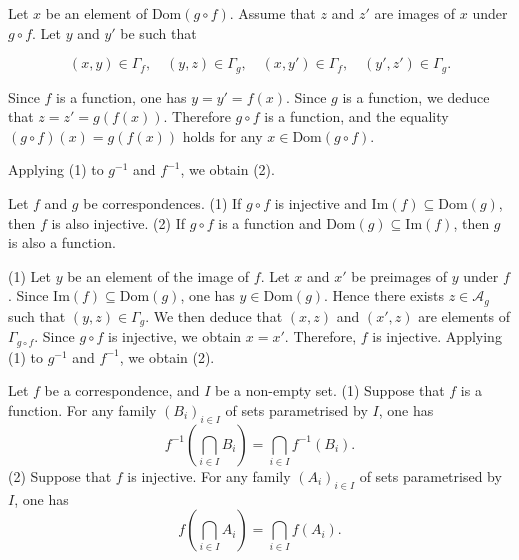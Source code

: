 \begin{proofenv}
Let \( x \) be an element of \(\text{Dom}(g \circ f)\). Assume that \( z \) and \( z' \) are images of \( x \) under \( g \circ f \). Let \( y \) and \( y' \) be such that

\[
(x,  y) \in \Gamma_f,  \quad (y,  z) \in \Gamma_g,  \quad (x,  y') \in \Gamma_f,  \quad (y',  z') \in \Gamma_g.
\]

Since \( f \) is a function,  one has \( y = y' = f(x) \). Since \( g \) is a function,  we deduce that \( z = z' = g(f(x)) \). Therefore \( g \circ f \) is a function,  and the equality \((g \circ f)(x) = g(f(x))\) holds for any \( x \in \text{Dom}(g \circ f) \).

Applying (1) to \( g^{-1} \) and \( f^{-1} \),  we obtain (2).
\end{proofenv} 


\begin{propositionenv}\label{proposition3.6.3}
    Let $f$ and $g$ be correspondences.
    \newline
    (1) If \( g \circ f \) is injective and \(\mathrm{Im}(f) \subseteq \mathrm{Dom}(g)\),  then \( f \) is also injective.
\newline
(2) If \( g \circ f \) is a function and \(\mathrm{Dom}(g) \subseteq \mathrm{Im}(f)\),  then \( g \) is also a function.
\end{propositionenv}




\begin{proofenv}
    \quad 
    \newline
    (1)  Let \( y \) be an element of the image of \( f \). Let \( x \) and \( x' \) be preimages of \( y \) under \( f \). Since \(\mathrm{Im}(f) \subseteq \mathrm{Dom}(g)\),  one has \( y \in \mathrm{Dom}(g) \). 
    Hence there exists \( z \in \mathscr{A}_g \) such that \((y,  z) \in \Gamma_g \). 
    We then deduce that \((x,  z)\) and \((x',  z)\) are elements of \(\Gamma_{g \circ f}\). Since \( g \circ f \) is injective,  we obtain \( x = x' \). Therefore,  \( f \) is injective.
\newline
Applying (1) to \( g^{-1} \) and \( f^{-1} \),  we obtain (2).
\end{proofenv}



\begin{propositionenv}\label{proposition3.6.4}
     Let \( f \) be a correspondence,  and \( I \) be a non-empty set.
\newline
     (1) Suppose that \( f \) is a function. For any family \((B_i)_{i \in I}\) of sets parametrised by \( I \),  one has
    \[
    f^{-1}\left(\bigcap_{i \in I} B_i\right) = \bigcap_{i \in I} f^{-1}(B_i).
    \]
    \newline
    (2) Suppose that \( f \) is injective. For any family \((A_i)_{i \in I}\) of sets parametrised by \( I \),  one has
    \[
    f\left(\bigcap_{i \in I} A_i\right) = \bigcap_{i \in I} f(A_i).
    \]
\end{propositionenv}


